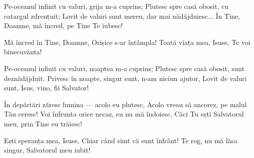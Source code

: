 \beginverse
Pe-oceanul infinit cu valuri, grija m-a cuprins;
Plutesc spre casă obosit, cu catargul zdrențuit;
Lovit de valuri sunt mereu, dar mai nădăjduiesc...
În Tine, Doamne, mă încred, pe Tine Te iubesc!
\endverse

\beginchorus
Mă încred în Tine, Doamne,
Orișice s-ar întâmpla!
Toată viața mea, Isuse,
Te voi binecuvânta!
\endchorus

\beginverse
Pe-oceanul infinit cu valuri, noaptea m-a cuprins;
Plutesc spre casă obosit, sunt deznădăjduit.
Privesc în noapte, singur sunt, n-am niciun ajutor,
Lovit de valuri sunt, Isus, vino, fii Salvator!
\endverse

\beginverse
În depărtări zăresc lumina — acolo eu plutesc,
Acolo vreau să ancorez, pe malul Tău ceresc!
Voi înfrunta orice necaz, eu nu mă îndoiesc,
Căci Tu ești Salvatorul meu, prin Tine eu trăiesc!
\endverse

\beginchorus
Ești speranța mea, Isuse,
Chiar când simt că sunt înfrânt!
Te rog, nu mă lăsa singur,
Salvatorul meu iubit!
\endchorus
\endsong